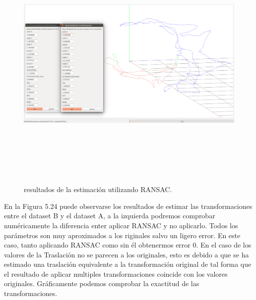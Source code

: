 \begin{figure}
\begin{center}
\label{fig:opciones de View}\includegraphics[height=12.0cm,width=18.0cm]{img/cap6/newData_EscalaTraslaRota_BA.png}
\hspace{0.5cm}

\end{center}

\caption{ resultados de la estimación  utilizando RANSAC.}
\end{figure}

En la Figura 5.24 puede observarse los resultados de estimar las transformaciones entre el dataset B y el dataset A, a la izquierda podremos comprobar numéricamente la diferencia enter aplicar RANSAC y no aplicarlo. Todos los parámetros son muy aproximados a los riginales salvo un ligero error. En este caso, tanto aplicando RANSAC como sin él obtenermos error 0. En el caso de los valores de la Traslación no se parecen a los originales, esto es debido a que se ha estimado una traslación equivalente a la transformación original de tal forma que el resultado de aplicar multiples transformaciones coincide con los valores originales. Gráficamente podemos comprobar la exactitud de las transformaciones.




